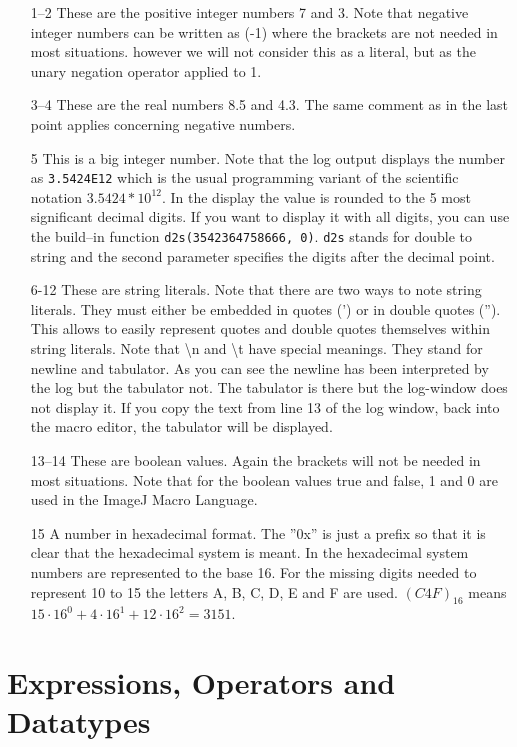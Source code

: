 \begin{enumerate}
\item[1--2] These are the positive integer numbers 7 and 3. Note that negative integer numbers can be written as (-1) where the brackets are not needed in most situations. however we will not consider this as a literal, but as the unary negation operator applied to 1.
\item[3--4] These are the real numbers 8.5 and 4.3. The same comment as in the last point applies concerning negative numbers.
\item[5] This is a big integer number. Note that the log output displays the number as {\tt 3.5424E12} which is the usual programming variant of the scientific notation $3.5424*10^{12}$. In the display the value is rounded to the 5 most significant decimal digits. If you want to display it with all digits, you can use the build--in function {\tt d2s(3542364758666, 0)}. {\tt d2s} stands for double to string and the second parameter specifies the digits after the decimal point.
\item[6-12] These are string literals. Note that there are two ways to note string literals. They must either be embedded in quotes (') or in double quotes (''). This allows to easily represent quotes and double quotes themselves within string literals. Note that \textbackslash n and \textbackslash t have special meanings. They stand for newline and tabulator. As you can see the newline has been interpreted by the log but the tabulator not. The tabulator is there but the log-window does not display it. If you copy the text from line 13 of the log window, back into the macro editor, the tabulator will be displayed.
\item[13--14] These are boolean values. Again the brackets will not be needed in most situations. Note that for the boolean values true and false, 1 and 0 are used in the ImageJ Macro Language. 
\item[15] A number in hexadecimal format. The ''0x'' is just a prefix so that it is clear that the hexadecimal system is meant. In the hexadecimal system numbers are represented to the base 16. For the missing  digits needed to represent 10 to 15 the letters A, B, C, D, E and F are used. $(C4F)_{16}$ means $15 \cdot 16^{0} + 4 \cdot 16^{1} + 12 \cdot 16^{2} = 3151$.
\end{enumerate}

\section{Expressions, Operators and Datatypes}

